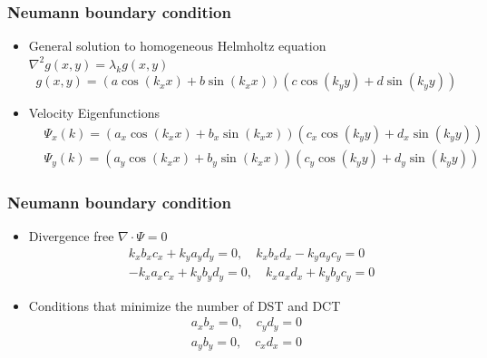\documentclass[serif,mathserif, 12pt]{beamer}
\begin{document}
\begin{frame}
  \frametitle{Neumann boundary condition}
  \begin{itemize}
  \item General solution to homogeneous Helmholtz equation $\nabla^2 g(x, y) = \lambda_k g(x, y)$
    \[
    g(x, y) = (a\cos(k_x x)+b\sin(k_x x))(c\cos(k_y y)+d\sin(k_y y))
    \]
  \item Velocity Eigenfunctions
    \[
    \begin{split}
      &\Psi_x(k) =  (a_x\cos(k_x x)+b_x\sin(k_x x))(c_x\cos(k_y y)+d_x\sin(k_y y)) \\
      &\Psi_y(k) =  (a_y\cos(k_x x)+b_y\sin(k_x x))(c_y\cos(k_y y)+d_y\sin(k_y y))
    \end{split}
    \]
  \end{itemize}
\end{frame}

\begin{frame}
  \frametitle{Neumann boundary condition}
  \begin{itemize}
  \item Divergence free $\nabla \cdot \Psi = 0$
    \[
    \begin{split}
      &k_xb_xc_x + k_ya_yd_y = 0,\quad k_xb_xd_x-k_ya_yc_y = 0 \\
      &-k_xa_xc_x + k_yb_yd_y = 0, \quad k_xa_xd_x+k_yb_yc_y = 0
    \end{split}
    \]
  \item Conditions that minimize the number of DST and DCT
    \[
    \begin{split}
      a_xb_x = 0, \quad c_yd_y = 0 \\
      a_yb_y = 0, \quad c_xd_x = 0
    \end{split}
    \]
  \end{itemize}
\end{frame}
\end{document}
